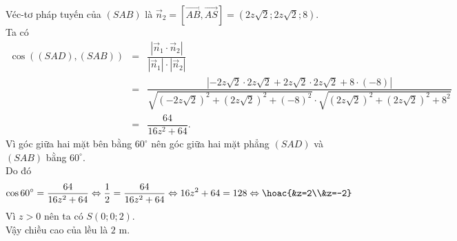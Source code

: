 \begin{bt}
{		Véc-tơ pháp tuyến của $(SAB)$ là $\overrightarrow{n}_2=\left[\overrightarrow{AB},\overrightarrow{AS}\right]=(2z\sqrt{2};2z\sqrt{2};8)$.\\
		Ta có
		\begin{eqnarray*}
			\cos((SAD),(SAB))&=&\dfrac{|\overrightarrow{n}_1\cdot \overrightarrow{n}_2|}{|\overrightarrow{n}_1|\cdot |\overrightarrow{n}_2|}\\
			&=&\dfrac{|-2z\sqrt{2}\cdot 2z\sqrt{2}+2z\sqrt{2}\cdot 2z\sqrt{2}+8\cdot(-8)|}{\sqrt{(-2z\sqrt{2})^2+(2z\sqrt{2})^2+(-8)^2}\cdot \sqrt{(2z\sqrt{2})^2+(2z\sqrt{2})^2+8^2}}\\
			&=&\dfrac{64}{16z^2+64}.
		\end{eqnarray*}
		Vì góc giữa hai mặt bên bằng $60^{\circ}$ nên góc giữa hai mặt phẳng $(SAD)$ và $(SAB)$ bằng $60^{\circ}$.\\
		Do đó
		$$\cos 60^{\circ}=\dfrac{64}{16z^2+64} \Leftrightarrow \dfrac{1}{2}=\dfrac{64}{16z^2+64}\Leftrightarrow 16z^2+64=128\Leftrightarrow \hoac{&z=2\\&z=-2}$$
		Vì $z>0$ nên ta có $S(0;0;2)$.\\
		Vậy chiều cao của lều là $2$ m.
	}
\end{bt}

